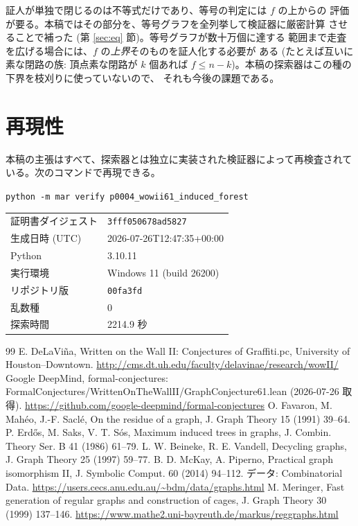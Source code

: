 \documentclass[paper=a4,fontsize=10.5pt,jafontsize=10.5pt]{jlreq}
\theoremstyle{plain}
\theoremstyle{definition}
\begin{document}
証人が単独で閉じるのは不等式だけであり、等号の判定には $f$ の上からの
評価が要る。本稿ではその部分を、等号グラフを全列挙して検証器に厳密計算
させることで補った (第 \ref{sec:eq} 節)。等号グラフが数十万個に達する
範囲まで走査を広げる場合には、$f$ の\emph{上界}そのものを証人化する必要が
ある (たとえば互いに素な閉路の族: 頂点素な閉路が $k$ 個あれば
$f \le n - k$)。本稿の探索器はこの種の下界を枝刈りに使っていないので、
それも今後の課題である。


\section*{再現性}
本稿の主張はすべて、探索器とは独立に実装された検証器によって再検査されている。次のコマンドで再現できる。

\begin{center}\texttt{python -m mar verify p0004\_wowii61\_induced\_forest}\end{center}

\begin{center}\begin{tabular}{ll}\toprule
証明書ダイジェスト & \texttt{3fff050678ad5827} \\
生成日時 (UTC) & 2026-07-26T12:47:35+00:00 \\
Python & 3.10.11 \\
実行環境 & Windows 11 (build 26200) \\
リポジトリ版 & \texttt{00fa3fd} \\
乱数種 & 0 \\
探索時間 & 2214.9 秒 \\
\bottomrule\end{tabular}\end{center}


\begin{thebibliography}{99}
 E. DeLaViña, Written on the Wall II: Conjectures of Graffiti.pc, University of Houston--Downtown. \url{http://cms.dt.uh.edu/faculty/delavinae/research/wowII/}
 Google DeepMind, formal-conjectures: FormalConjectures/WrittenOnTheWallII/GraphConjecture61.lean (2026-07-26 取得). \url{https://github.com/google-deepmind/formal-conjectures}
 O. Favaron, M. Mahéo, J.-F. Saclé, On the residue of a graph, J. Graph Theory 15 (1991) 39--64.
 P. Erdős, M. Saks, V. T. Sós, Maximum induced trees in graphs, J. Combin. Theory Ser. B 41 (1986) 61--79.
 L. W. Beineke, R. E. Vandell, Decycling graphs, J. Graph Theory 25 (1997) 59--77.
 B. D. McKay, A. Piperno, Practical graph isomorphism II, J. Symbolic Comput. 60 (2014) 94--112. データ: Combinatorial Data. \url{https://users.cecs.anu.edu.au/~bdm/data/graphs.html}
 M. Meringer, Fast generation of regular graphs and construction of cages, J. Graph Theory 30 (1999) 137--146. \url{https://www.mathe2.uni-bayreuth.de/markus/reggraphs.html}
\end{thebibliography}
\end{document}
